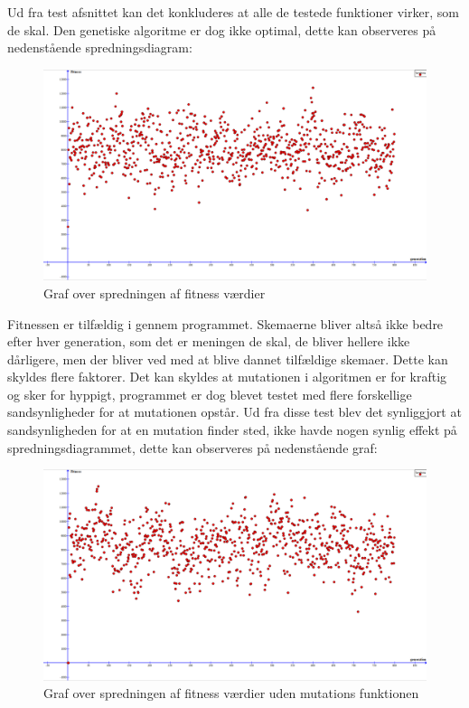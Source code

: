 Ud fra test afsnittet kan det konkluderes at alle de testede funktioner virker, som de skal. Den genetiske algoritme er dog ikke optimal, dette kan observeres på nedenstående spredningsdiagram:
\begin{figure}[!h]
\centering
\includegraphics[width=\textwidth]{partials/graphics/spredning.png}
\caption{Graf over spredningen af fitness værdier}
\label{fig:spredning}
\end{figure}

Fitnessen er tilfældig i gennem programmet. Skemaerne bliver altså ikke bedre efter hver generation, som det er meningen de skal, de bliver hellere ikke dårligere, men der bliver ved med at blive dannet tilfældige skemaer. Dette kan skyldes flere faktorer. Det kan skyldes at mutationen i algoritmen er for kraftig og sker for hyppigt, programmet er dog blevet testet med flere forskellige sandsynligheder for at mutationen opstår. Ud fra disse test blev det synliggjort at sandsynligheden for at en mutation finder sted, ikke havde nogen synlig effekt på spredningsdiagrammet, dette kan observeres på nedenstående graf:
\begin{figure}[!h]
\centering
\includegraphics[width=\textwidth]{partials/graphics/spredningudenmutation.png}
\caption{Graf over spredningen af fitness værdier uden mutations funktionen}
\label{fig:spredningudenmutation}
\end{figure}

